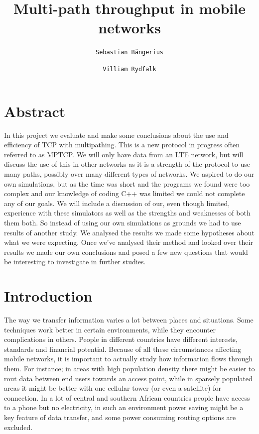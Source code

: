 \documentclass[11pt,twocolumn]{article}
\author{
  \texttt{Sebastian Bångerius}
  \and
  \texttt{Villiam Rydfalk}
}
\begin{document}

\title{Multi-path throughput in mobile networks}
\maketitle

\cleardoublepage


\section{Abstract}

In this project we evaluate and make some conclusions about the use and efficiency of TCP with multipathing. This is a new protocol in progress often referred to as MPTCP. We will only have data from an LTE network, but will discuss the use of this in other networks as it is a strength of the protocol to use many paths, possibly over many different types of networks. We aspired to do our own simulations, but as the time was short and the programs we found  were too complex and our knowledge of coding C++ was limited we could not complete any of our goals. We will include a discussion of our, even though limited, experience with these simulators as well as the strengths and weaknesses of both them both. So instead of using our own simulations as grounds we had to use results of another study. \cite{MPTCP-LTE} We analysed the results we made some hypotheses about what we were expecting. Once we've analysed their method and looked over their results we made our own conclusions and posed a few new questions that would be interesting to investigate in further studies.



\section{Introduction}

The way we transfer information varies a lot between places and situations. Some techniques work better in certain environments, while they encounter complications in others. People in different countries have different interests, standards and financial potential. Because of all these circumstances affecting mobile networks, it is important to actually study how information flows through them. For instance; in areas with high population density there might be easier to rout data between end users towards an access point, while in sparsely populated areas it might be better with one cellular tower (or even a satellite) for connection. In a lot of central and southern African countries people have access to a phone but no electricity, in such an environment power saving might be a key feature of data transfer, and some power consuming routing options are excluded.
\end{document}
